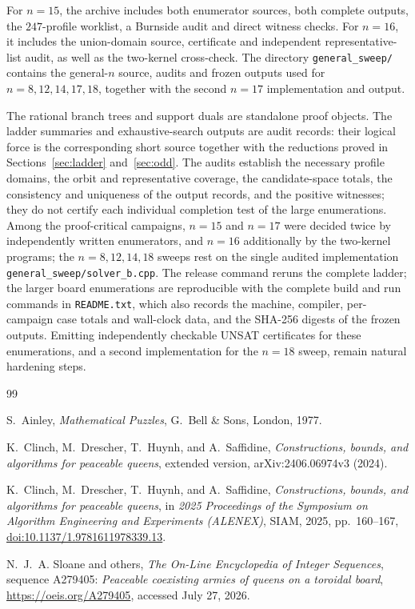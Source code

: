 \documentclass[11pt]{amsart}
\theoremstyle{definition}
\theoremstyle{remark}
\newcommand{\bs}{\discretionary{}{}{}}
\begin{document}
For $n=15$, the archive includes both enumerator sources, both complete
outputs, the $247$-profile worklist, a Burnside audit and direct witness
checks.  For $n=16$, it includes the union-domain source, certificate and
independent representative-list audit, as well as the two-kernel
cross-check.  The directory \texttt{general\_\bs{}sweep/} contains the
general-$n$ source, audits and frozen outputs used for $n=8,12,14,17,18$,
together with the second $n=17$ implementation and output.

The rational branch trees and support duals are standalone proof objects.
The ladder summaries and exhaustive-search outputs are audit records: their
logical force is the corresponding short source together with the reductions
proved in Sections~\ref{sec:ladder} and~\ref{sec:odd}.  The audits establish
the necessary profile domains, the orbit and representative coverage, the
candidate-space totals, the consistency and uniqueness of the output records,
and the positive witnesses; they do not certify each individual completion
test of the large enumerations.  Among the proof-critical campaigns, $n=15$
and $n=17$ were decided twice by independently written enumerators, and
$n=16$ additionally by the two-kernel programs; the $n=8,12,14,18$
sweeps rest on the single audited implementation
\texttt{general\_\bs{}sweep/solver\_\bs{}b.cpp}.  The release command reruns
the complete ladder; the larger board enumerations are reproducible with the
complete build and run commands in \texttt{README.txt}, which also records
the machine, compiler, per-campaign case totals and wall-clock data, and the
SHA-256 digests of the frozen outputs.  Emitting independently checkable
UNSAT certificates for these enumerations, and a second implementation for
the $n=18$ sweep, remain natural hardening steps.

\fussy

\begin{thebibliography}{99}

S.~Ainley,
\emph{Mathematical Puzzles},
G.~Bell \& Sons, London, 1977.

K.~Clinch, M.~Drescher, T.~Huynh, and A.~Saffidine,
\emph{Constructions, bounds, and algorithms for peaceable queens},
extended version, arXiv:2406.06974v3 (2024).

K.~Clinch, M.~Drescher, T.~Huynh, and A.~Saffidine,
\emph{Constructions, bounds, and algorithms for peaceable queens},
in \emph{2025 Proceedings of the Symposium on Algorithm Engineering and
Experiments (ALENEX)}, SIAM, 2025, pp.~160--167,
\href{https://doi.org/10.1137/1.9781611978339.13}
{doi:10.1137/1.9781611978339.13}.

N.~J.~A. Sloane and others,
\emph{The On-Line Encyclopedia of Integer Sequences}, sequence A279405:
\emph{Peaceable coexisting armies of queens on a toroidal board},
\url{https://oeis.org/A279405}, accessed July 27, 2026.

\end{thebibliography}
\end{document}
